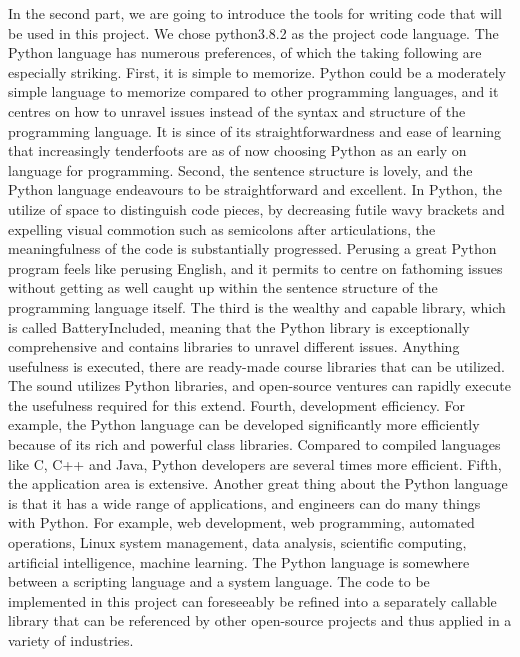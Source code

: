 \documentclass{sigchi}
\begin{document}
In the second part, we are going to introduce the tools for writing code that will be used in this project. We chose python3.8.2 as the project code language. The Python language has numerous preferences, of which the taking following are especially striking. First, it is simple to memorize. Python could be a moderately simple language to memorize compared to other programming languages, and it centres on how to unravel issues instead of the syntax and structure of the programming language. It is since of its straightforwardness and ease of learning that increasingly tenderfoots are as of now choosing Python as an early on language for programming. Second, the sentence structure is lovely, and the Python language endeavours to be straightforward and excellent. In Python, the utilize of space to distinguish code pieces, by decreasing futile wavy brackets and expelling visual commotion such as semicolons after articulations, the meaningfulness of the code is substantially progressed. Perusing a great Python program feels like perusing English, and it permits to centre on fathoming issues without getting as well caught up within the sentence structure of the programming language itself. The third is the wealthy and capable library, which is called BatteryIncluded, meaning that the Python library is exceptionally comprehensive and contains libraries to unravel different issues. Anything usefulness is executed, there are ready-made course libraries that can be utilized. The sound utilizes Python libraries, and open-source ventures can rapidly execute the usefulness required for this extend. Fourth, development efficiency. For example, the Python language can be developed significantly more efficiently because of its rich and powerful class libraries. Compared to compiled languages like C, C++ and Java, Python developers are several times more efficient. Fifth, the application area is extensive. Another great thing about the Python language is that it has a wide range of applications, and engineers can do many things with Python. For example, web development, web programming, automated operations, Linux system management, data analysis, scientific computing, artificial intelligence, machine learning. The Python language is somewhere between a scripting language and a system language. The code to be implemented in this project can foreseeably be refined into a separately callable library that can be referenced by other open-source projects and thus applied in a variety of industries.
\end{document}
